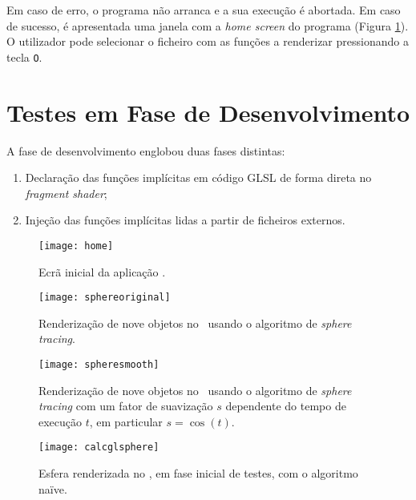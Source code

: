 Em caso de erro, o programa não arranca e a sua execução é abortada. Em caso de sucesso, é apresentada uma janela com a \textit{home screen} do programa (Figura \ref{fig::home}). O utilizador pode selecionar o ficheiro com as funções a renderizar pressionando a tecla \verb|O|.


\section{Testes em Fase de Desenvolvimento}
\label{sec::teste:dev}

A fase de desenvolvimento englobou duas fases distintas:
\begin{enumerate}[nosep]
	\item Declaração das funções implícitas em código \acs{GLSL} de forma direta no \textit{fragment shader};
	\item Injeção das funções implícitas lidas a partir de ficheiros externos.
\end{enumerate}



\begin{figure}[!htbp]
	\centering
	\texttt{[image: home]}
	\caption[Ecrã inicial da aplicação]{Ecrã inicial da aplicação \theapp.}
	\label{fig::home}
\end{figure}

\begin{figure}[!htbp]
	\centering
	\texttt{[image: sphereoriginal]}
	\caption[Nove objetos com \textit{sphere tracing} no \theapp]{Renderização de nove objetos no \theapp~usando o algoritmo de \textit{sphere tracing}.}
	\label{fig::sphereoriginal}
\end{figure}

\begin{figure}[!htbp]
	\centering
	\texttt{[image: spheresmooth]}
	\caption[Nove objetos com \textit{sphere tracing} e suavização no \theapp]{Renderização de nove objetos no \theapp~usando o algoritmo de \textit{sphere tracing} com um fator de suavização $s$ dependente do tempo de execução $t$, em particular $s = \cos(t)$.}
	\label{fig::spheresmooth}
\end{figure}

\begin{figure}[!htbp]
	\centering
	\texttt{[image: calcglsphere]}
	\caption[Esfera no \theapp~com algoritmo naïve]{Esfera renderizada no \theapp, em fase inicial de testes, com o algoritmo naïve.}
	\label{fig::calcglsphere}
\end{figure}

